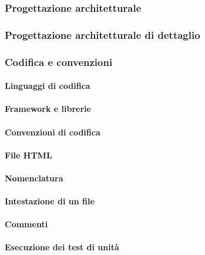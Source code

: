 \subsubsection{Progettazione architetturale}
\subsubsection{Progettazione architetturale di dettaglio}
\subsubsection{Codifica e convenzioni}
\paragraph{Linguaggi di codifica}
\paragraph{Framework e librerie}
\paragraph{Convenzioni di codifica}
\paragraph{File HTML}
\paragraph{Nomenclatura}
\paragraph{Intestazione di un file}
\paragraph{Commenti}
\paragraph{Esecuzione dei test di unità}